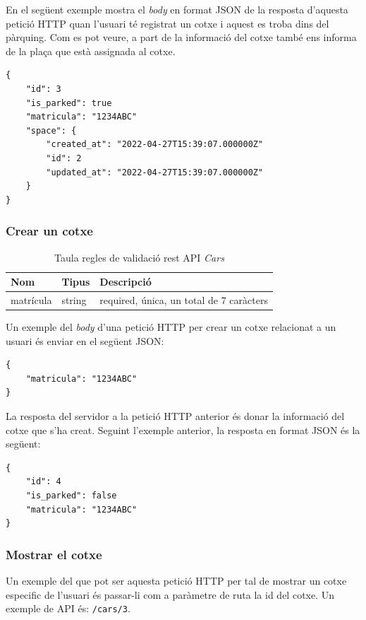 En el següent exemple mostra el \emph{body} en format JSON de la resposta d'aquesta
petició HTTP quan l'usuari té registrat un cotxe i aquest es troba dins del pàrquing.
Com es pot veure, a part de la informació del cotxe també ens informa de la plaça
que està assignada al cotxe.
\begin{verbatim}
{
    "id": 3
    "is_parked": true
    "matricula": "1234ABC"
    "space": {
        "created_at": "2022-04-27T15:39:07.000000Z"
        "id": 2
        "updated_at": "2022-04-27T15:39:07.000000Z"
    }
}
\end{verbatim}

\subsubsection{Crear un cotxe}
\label{sssec:crear_cotxe}

\begin{table}[H]
\centering
\begin{tabular}{lll}
\hline
\textbf{Nom} & \textbf{Tipus} & \textbf{Descripció} \\ \hline
matrícula              & string       &  required, única, un total de 7 caràcters     \\ \hline
\end{tabular}
\caption{Taula regles de validació rest API \emph{Cars}}
\label{tab:my-cars-validation-table}
\end{table}

Un exemple del \emph{body} d'una petició HTTP per crear un cotxe relacionat a un usuari és enviar
en el següent JSON:
\begin{verbatim}
{
    "matricula": "1234ABC"
}
\end{verbatim}

La resposta del servidor a la petició HTTP anterior és donar la informació del cotxe que s'ha creat.
Seguint l'exemple anterior, la resposta en format JSON és la següent:
\begin{verbatim}
{
    "id": 4
    "is_parked": false
    "matricula": "1234ABC"
}
\end{verbatim}

\subsubsection{Mostrar el cotxe}
\label{sssec:mostrar_cotxe}

Un exemple del que pot ser aquesta petició HTTP per tal de mostrar un cotxe especific de l'usuari
és passar-li com a paràmetre de ruta la id del cotxe. Un exemple de API és: \texttt{/cars/3}.

